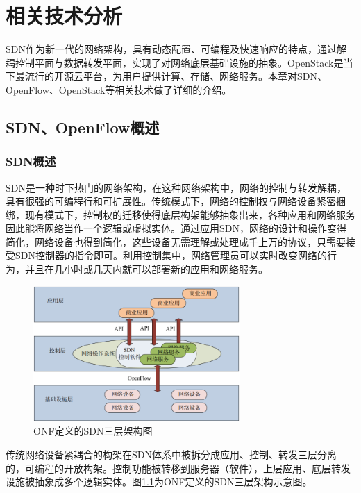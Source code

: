 
\chapter{相关技术分析}
SDN作为新一代的网络架构，具有动态配置、可编程及快速响应的特点，通过解耦控制平面与数据转发平面，实现了对网络底层基础设施的抽象。OpenStack是当下最流行的开源云平台，为用户提供计算、存储、网络服务。本章对SDN、OpenFlow、OpenStack等相关技术做了详细的介绍。
\section{SDN、OpenFlow概述}
\subsection{SDN概述}
SDN是一种时下热门的网络架构，在这种网络架构中，网络的控制与转发解耦，具有很强的可编程行和可扩展性。传统模式下，网络的控制权与网络设备紧密捆绑，现有模式下，控制权的迁移使得底层构架能够抽象出来，各种应用和网络服务因此能将网络当作一个逻辑或虚拟实体。通过应用SDN，网络的设计和操作变得简化，网络设备也得到简化，这些设备无需理解或处理成千上万的协议，只需要接受SDN控制器的指令即可。利用控制集中，网络管理员可以实时改变网络的行为，并且在几小时或几天内就可以部署新的应用和网络服务。

\begin{figure}[!htb]
  \centering
  \includegraphics[width=0.7\textwidth]{logo/sdn.png}
  \caption{ONF定义的SDN三层架构图}
  \label{fig:sdn}
\end{figure}

传统网络设备紧耦合的构架在SDN体系中被拆分成应用、控制、转发三层分离的，可编程的开放构架。控制功能被转移到服务器（软件），上层应用、底层转发设施被抽象成多个逻辑实体。图\ref{fig:sdn}为ONF定义的SDN三层架构示意图。

